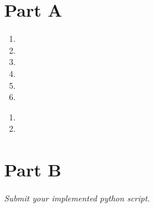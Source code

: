 \documentclass[12pt,twoside]{article}
\begin{document}

\begin{problems}

\section*{Part A}

\problem  %

\begin{problemparts}
\problempart  %
\problempart  %
\problempart  %
\end{problemparts}

\problem  %

\begin{problemparts}
\problempart
\begin{enumerate}
\item
\item
\item
\item
\item
\item
\end{enumerate}
\problempart
\begin{enumerate}
\item 
\item
\end{enumerate}
\end{problemparts}

\problem  %
\begin{problemparts}
\problempart
\problempart
\end{problemparts}

\section*{Part B}
\problem  %
\begin{problemparts}
\emph{Submit your implemented python script.}
\problempart
\problempart
\problempart
\problempart
\problempart
\end{problemparts}
\end{problems}
\end{document}
